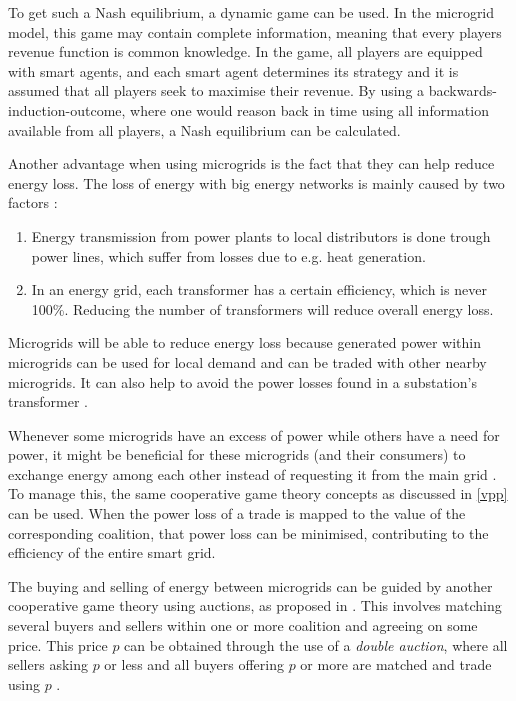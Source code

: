 To get such a Nash equilibrium, a dynamic game can be used. In the microgrid model, this game may contain complete information, meaning that every players revenue function is common knowledge. In the game, all players are equipped with smart agents, and each smart agent determines its strategy and it is assumed that all players seek to maximise their revenue. By using a backwards-induction-outcome, where one would reason back in time using all information available from all players, a Nash equilibrium can be calculated\cite{MicrogridModellingPetrosAristidou}.

Another advantage when using microgrids is the fact that they can help reduce energy loss. The loss of energy with big energy networks is mainly caused by two factors \cite{EnergyLossURL}: 

\begin{enumerate}
\item Energy transmission from power plants to local distributors is done trough power lines, which suffer from losses due to e.g. heat generation\cite{LasseterPaigi2004}.
\item In an energy grid, each transformer has a certain efficiency, which is never 100\%. Reducing the number of transformers will reduce overall energy loss.
\end{enumerate}

Microgrids will be able to reduce energy loss because generated power within microgrids can be used for local demand and can be traded with other nearby microgrids. It can also help to avoid the power losses found in a substation's transformer \cite{keypaper}.

Whenever some microgrids have an excess of power while others have a need for power, it might be beneficial for these microgrids (and their consumers) to exchange energy among each other instead of requesting it from the main grid \cite{SaadHanPoorEtAl2011}. To manage this, the same cooperative game theory concepts as discussed in \ref{vpp} can be used. When the power loss of a trade is mapped to the value of the corresponding coalition, that power loss can be minimised, contributing to the efficiency of the entire smart grid. 

The buying and selling of energy between microgrids can be guided by another cooperative game theory using auctions, as proposed in \cite{SaadHanPoorEtAl2011}. This involves matching several buyers and sellers within one or more coalition and agreeing on some price. This price $p$ can be obtained through the use of a \emph{double auction}, where all sellers asking $p$ or less and all buyers offering $p$ or more are matched and trade using $p$ \cite{gjerstad1998price}.

